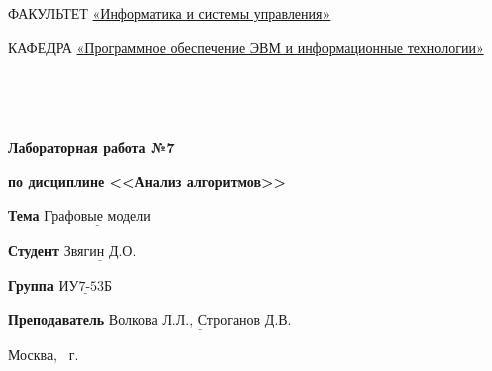 \begin{titlepage}
	\noindent ФАКУЛЬТЕТ \underline{«Информатика и системы управления»}
	
	\noindent КАФЕДРА \underline{«Программное обеспечение ЭВМ и информационные технологии»}
	
	\
	
	\
	
	\begin{center}
	\noindent\begin{minipage}{1.0\textwidth}\centering
	\Large\textbf{Лабораторная работа №7}
	
	\textbf{по дисциплине <<Анализ алгоритмов>>}
	
	\end{minipage}
	\end{center}
	\noindent\textbf{Тема} $\underline{\text{Графовые модели}}$
	
	\noindent\textbf{Студент} $\underline{\text{Звягин Д.О.}}$
	
	\noindent\textbf{Группа} $\underline{\text{ИУ7-53Б}}$
	
	\noindent\textbf{Преподаватель} $\underline{\text{Волкова Л.Л., Строганов Д.В.}}$
	
	\begin{center}
	\mbox{}
	\vfill
	Москва, \the\year~г.
	\end{center}
	\clearpage
	\end{titlepage}